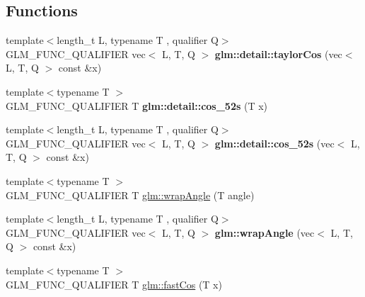 \subsection*{Functions}
\begin{DoxyCompactItemize}
\item 
\mbox{\label{fast__trigonometry_8inl_a2cb8ceabe04661b078d956cf0a5e96c7}} 
{\footnotesize template$<$length\+\_\+t L, typename T , qualifier Q$>$ }\\G\+L\+M\+\_\+\+F\+U\+N\+C\+\_\+\+Q\+U\+A\+L\+I\+F\+I\+ER vec$<$ L, T, Q $>$ {\bfseries glm\+::detail\+::taylor\+Cos} (vec$<$ L, T, Q $>$ const \&x)
\item 
\mbox{\label{fast__trigonometry_8inl_a09055f8d723109dc95c8cc2309e20acc}} 
{\footnotesize template$<$typename T $>$ }\\G\+L\+M\+\_\+\+F\+U\+N\+C\+\_\+\+Q\+U\+A\+L\+I\+F\+I\+ER T {\bfseries glm\+::detail\+::cos\+\_\+52s} (T x)
\item 
\mbox{\label{fast__trigonometry_8inl_af69b36906b6e079461bf24ba03c89e73}} 
{\footnotesize template$<$length\+\_\+t L, typename T , qualifier Q$>$ }\\G\+L\+M\+\_\+\+F\+U\+N\+C\+\_\+\+Q\+U\+A\+L\+I\+F\+I\+ER vec$<$ L, T, Q $>$ {\bfseries glm\+::detail\+::cos\+\_\+52s} (vec$<$ L, T, Q $>$ const \&x)
\item 
{\footnotesize template$<$typename T $>$ }\\G\+L\+M\+\_\+\+F\+U\+N\+C\+\_\+\+Q\+U\+A\+L\+I\+F\+I\+ER T \hyperlink{group__gtx__fast__trigonometry_ga069527c6dbd64f53435b8ebc4878b473}{glm\+::wrap\+Angle} (T angle)
\item 
\mbox{\label{fast__trigonometry_8inl_a7500f6763ca1feb7c2ab574bede4999d}} 
{\footnotesize template$<$length\+\_\+t L, typename T , qualifier Q$>$ }\\G\+L\+M\+\_\+\+F\+U\+N\+C\+\_\+\+Q\+U\+A\+L\+I\+F\+I\+ER vec$<$ L, T, Q $>$ {\bfseries glm\+::wrap\+Angle} (vec$<$ L, T, Q $>$ const \&x)
\item 
{\footnotesize template$<$typename T $>$ }\\G\+L\+M\+\_\+\+F\+U\+N\+C\+\_\+\+Q\+U\+A\+L\+I\+F\+I\+ER T \hyperlink{group__gtx__fast__trigonometry_gab34c8b45c23c0165a64dcecfcc3b302a}{glm\+::fast\+Cos} (T x)
\item 

\end{DoxyCompactItemize}
